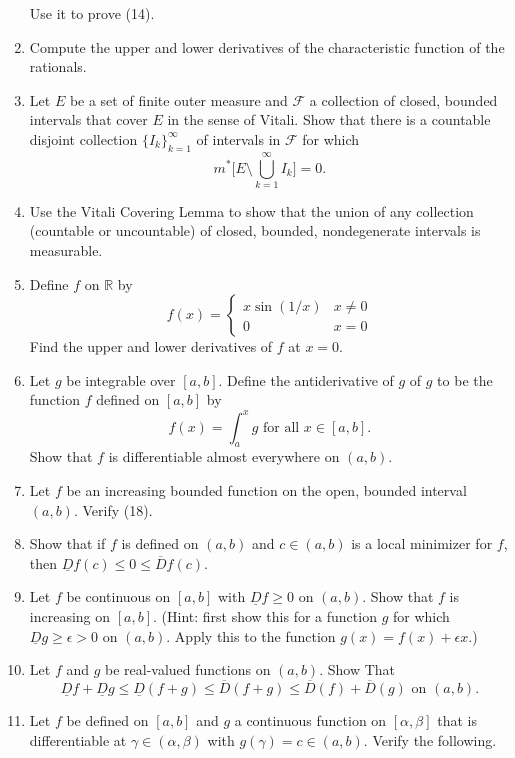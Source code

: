 \begin{enumerate}
    Use it to prove (14).
    \item Compute the upper and lower derivatives of the characteristic function of the rationals.
    \item Let $E$ be a set of finite outer measure and $\mathcal{F}$ a collection of closed, bounded intervals that cover $E$ in the sense of Vitali.
    Show that there is a countable disjoint collection $\{I_k\}_{k=1}^\infty$ of intervals in $\mathcal{F}$ for which
    \[
        m^*\biggl[E\setminus\bigcup_{k=1}^\infty I_k\biggr]=0.    
    \]
    \item Use the Vitali Covering Lemma to show that the union of any collection (countable or uncountable) of closed, bounded, nondegenerate intervals is measurable.
    \item Define $f$ on $\mathbb{R}$ by
    \[
        f(x)=
        \begin{cases}
            x\sin(1/x)&x\neq0\\
            0&x=0
        \end{cases}    
    \]
    Find the upper and lower derivatives of $f$ at $x=0$.
    \item Let $g$ be integrable over $[a,b]$. Define the antiderivative of $g$ of $g$ to be the function $f$ defined on $[a,b]$ by
    \[
        f(x)=\int_a^xg\text{ for all }x\in[a,b].    
    \]
    Show that $f$ is differentiable almost everywhere on $(a,b)$.
    \item Let $f$ be an increasing bounded function on the open, bounded interval $(a,b)$. Verify (18).
    \item Show that if $f$ is defined on $(a,b)$ and $c\in(a,b)$ is a local minimizer for $f$, then $\underline{D}f(c)\le0\le\overline{D}f(c)$.
    \item Let $f$ be continuous on $[a,b]$ with $\underline{D}f\ge0$ on $(a,b)$. Show that $f$ is increasing on $[a,b]$.
    (Hint: first show this for a function $g$ for which $\underline{D}g\ge\epsilon>0$ on $(a,b)$. Apply this to the function $g(x)=f(x)+\epsilon x$.)
    \item Let $f$ and $g$ be real-valued functions on $(a,b)$. Show That
    \[
        \underline{D}f+\underline{D}g\le\underline{D}(f+g)\le\overline{D}(f+g)\le \overline{D}(f)+\overline{D}(g)\text{ on }(a,b).
    \]
    \item Let $f$ be defined on $[a,b]$ and $g$ a continuous function on $[\alpha,\beta]$ that is differentiable at $\gamma\in(\alpha,\beta)$ with $g(\gamma)=c\in(a,b)$. Verify the following.
    \begin{enumerate}[label=(\roman*),align=left]

\end{enumerate}
\end{enumerate}

